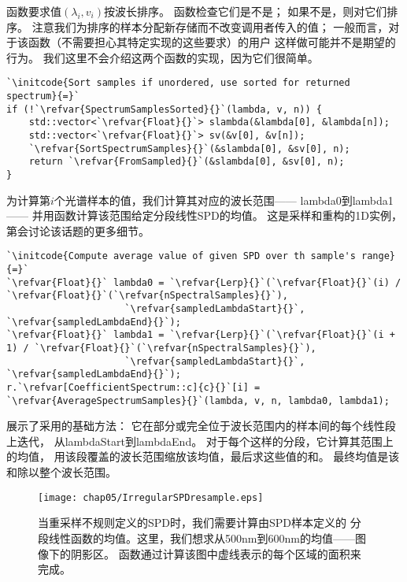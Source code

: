 函数要求值$(\lambda_i,v_i)$按波长排序。
{}函数检查它们是不是；
如果不是，则{}对它们排序。
注意我们为排序的样本分配新存储而不改变调用者传入的值；
一般而言，对于该函数（不需要担心其特定实现的这些要求）的用户
这样做可能并不是期望的行为。
我们这里不会介绍这两个函数的实现，因为它们很简单。
\begin{lstlisting}
`\initcode{Sort samples if unordered, use sorted for returned spectrum}{=}`
if (!`\refvar{SpectrumSamplesSorted}{}`(lambda, v, n)) {
    std::vector<`\refvar{Float}{}`> slambda(&lambda[0], &lambda[n]);
    std::vector<`\refvar{Float}{}`> sv(&v[0], &v[n]);
    `\refvar{SortSpectrumSamples}{}`(&slambda[0], &sv[0], n);
    return `\refvar{FromSampled}{}`(&slambda[0], &sv[0], n);
}
\end{lstlisting}

为计算第$i$个光谱样本的值，我们计算其对应的波长范围——
{\ttfamily lambda0}到{\ttfamily lambda1}——
并用函数计算该范围给定分段线性SPD的均值。
这是采样和重构的1D实例，第会讨论该话题的更多细节。
\begin{lstlisting}
`\initcode{Compute average value of given SPD over th sample's range}{=}`
`\refvar{Float}{}` lambda0 = `\refvar{Lerp}{}`(`\refvar{Float}{}`(i) / `\refvar{Float}{}`(`\refvar{nSpectralSamples}{}`), 
                     `\refvar{sampledLambdaStart}{}`, `\refvar{sampledLambdaEnd}{}`);
`\refvar{Float}{}` lambda1 = `\refvar{Lerp}{}`(`\refvar{Float}{}`(i + 1) / `\refvar{Float}{}`(`\refvar{nSpectralSamples}{}`), 
                     `\refvar{sampledLambdaStart}{}`, `\refvar{sampledLambdaEnd}{}`);
r.`\refvar[CoefficientSpectrum::c]{c}{}`[i] = `\refvar{AverageSpectrumSamples}{}`(lambda, v, n, lambda0, lambda1);
\end{lstlisting}

展示了采用的基础方法：
它在部分或完全位于波长范围内的样本间的每个线性段上迭代，
从{\ttfamily lambdaStart}到{\ttfamily lambdaEnd}。
对于每个这样的分段，它计算其范围上的均值，
用该段覆盖的波长范围缩放该均值，最后求这些值的和。
最终均值是该和除以整个波长范围。
\begin{figure}[htbp]
    \centering\texttt{[image: chap05/IrregularSPDresample.eps]}
    \caption{当重采样不规则定义的SPD时，我们需要计算由SPD样本定义的
        分段线性函数的均值。这里，我们想求从500nm到600nm的均值——图像下的阴影区。
        函数通过计算该图中虚线表示的每个区域的面积来完成。}
    \label{fig:5.2}
\end{figure}

